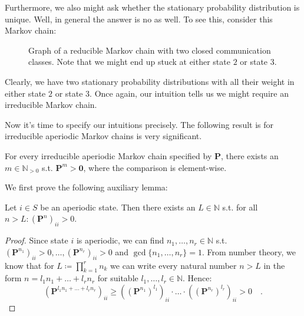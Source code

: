 \documentclass[../../main.tex]{subfiles}
\begin{document}
Furthermore, we also might ask whether the stationary probability distribution is unique. Well, in general the answer is no as well. To see this, consider this Markov chain:

\begin{figure}[h]
    \center
    \caption{Graph of a reducible Markov chain with two closed communication classes. Note that we might end up stuck at either state $2$ or state $3$.}
    \label{fig:markov_chain_periodic}
\end{figure}

Clearly, we have two stationary probability distributions with all their weight in either state $2$ or state $3$. Once again, our intuition tells us we might require an irreducible Markov chain.

Now it's time to specify our intuitions precisely. The following result is for irreducible aperiodic Markov chains is very significant.

\begin{theorem}
    For every irreducible aperiodic Markov chain specified by $\bm{P}$, there exists an $m \in \mathbb{N}_{>0}$ s.t. $\bm{P}^m > \bm{0}$, where the comparison is element-wise.
    \label{theorem:positive_transition_matrix}
\end{theorem}

We first prove the following auxiliary lemma:

\begin{lemma}
    Let $i \in S$ be an aperiodic state. Then there exists an $L \in \mathbb{N}$ s.t. for all $n > L: (\bm{P}^n)_{ii} > 0$.
    \label{lemma:aux}
\end{lemma}
\begin{proof}
    Since state $i$ is aperiodic, we can find $n_1, \dots, n_r \in \mathbb{N}$ s.t. $(\bm{P}^{n_1})_{ii} > 0, \dots, (\bm{P}^{n_r})_{ii} > 0$ and $\gcd \{ n_1, \dots , n_r \} = 1$. From number theory, we know that for $L \coloneqq \prod_{k=1}^{r} n_k$ we can write every natural number $n > L$ in the form $n = l_1 n_1 + \dots + l_r n_r$ for suitable $l_1, \dots, l_r \in \mathbb{N}$. Hence:
    \[
        (\bm{P}^{l_1 n_1 + \dots + l_r n_r})_{ii} \geq ((\bm{P}^{n_1})^{l_1})_{ii} \cdot \dots \cdot ((\bm{P}^{n_r})^{l_r})_{ii} > 0 \quad .
    \]
\end{proof}
\end{document}
